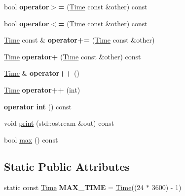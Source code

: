 \begin{DoxyCompactItemize}
\item 
\mbox{\label{classTime_a1f7d030e8a6095b0bcd41bf4c5db3719}} 
bool {\bfseries operator$>$=} (\hyperlink{classTime}{Time} const \&other) const
\item 
\mbox{\label{classTime_a31ca86633797092eb6f997e17dd1a267}} 
bool {\bfseries operator$<$=} (\hyperlink{classTime}{Time} const \&other) const
\item 
\mbox{\label{classTime_a54a1d73b40abf9578a5d324d2805fdce}} 
\hyperlink{classTime}{Time} const  \& {\bfseries operator+=} (\hyperlink{classTime}{Time} const \&other)
\item 
\mbox{\label{classTime_ace5e47a96c86c077b4e42b6713ae70de}} 
\hyperlink{classTime}{Time} {\bfseries operator+} (\hyperlink{classTime}{Time} const \&other) const
\item 
\mbox{\label{classTime_a55e7ec82d5f390aa1896084e25a0f5a5}} 
\hyperlink{classTime}{Time} \& {\bfseries operator++} ()
\item 
\mbox{\label{classTime_a9d672dbfc01b4d7f7d5789640017dc37}} 
\hyperlink{classTime}{Time} {\bfseries operator++} (int)
\item 
\mbox{\label{classTime_a7bc1d44c446e70740ab3f0dd64e457be}} 
{\bfseries operator int} () const
\item 
void \hyperlink{classTime_a2596ef53ebb188dc75b88160bd0aa230}{print} (std\+::ostream \&out) const
\item 
bool \hyperlink{classTime_a57f85c6b8295acdcf4e2f22ce7685170}{max} () const
\end{DoxyCompactItemize}
\subsection*{Static Public Attributes}
\begin{DoxyCompactItemize}
\item 
\mbox{\label{classTime_aeb625f84f2755479deac3ca3fd1d1cb4}} 
static const \hyperlink{classTime}{Time} {\bfseries M\+A\+X\+\_\+\+T\+I\+ME} = \hyperlink{classTime}{Time}((24 $\ast$ 3600) -\/ 1)
\end{DoxyCompactItemize}

